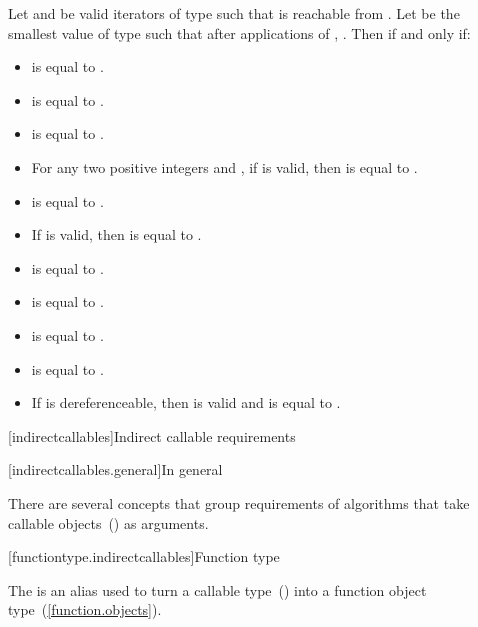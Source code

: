 \begin{addedblock}
\pnum
Let  and  be valid iterators of type  such that  is reachable
from . Let  be the smallest value of type  such that after
 applications of , . Then
   if and
only if:

\begin{itemize}
\item {} is equal to .
\item {} is equal to .
\item {} is equal to .
\item For any two positive integers  and , if  is valid, then
 is equal to .
\item {} is equal to .
\item If  is valid, then  is equal to .
\item {} is equal to .
\item {} is equal to .
\item {} is equal to .
\item {} is equal to .
\item If  is dereferenceable, then  is valid and is equal to .
\end{itemize}

[indirectcallables]{Indirect callable requirements}

[indirectcallables.general]{In general}

\pnum
There are several concepts that group requirements of algorithms that take callable
objects~() as arguments.


[functiontype.indirectcallables]{Function type}

\pnum
The  is an alias used to turn a callable type~() into a function
object type~(\ref{function.objects}).


\end{addedblock}
